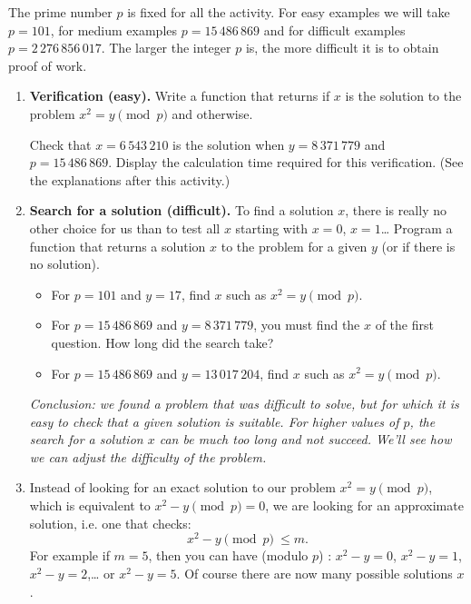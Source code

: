 \documentclass[11pt,class=report,crop=false]{standalone}
\begin{document}
\begin{activite}
The prime number $p$ is fixed for all the activity. 
For easy examples we will take $p = 101$, for medium examples $p = 15\,486\,869$ and for difficult examples $p = 2\,276\,856\,017$. The larger the integer $p$ is, the more difficult it is to obtain proof of work.

\begin{enumerate}
  \item \textbf{Verification (easy).} 
  Write a  function that returns  if $x$ is the solution to the problem $x^2 = y \pmod{p}$ and  otherwise.
  
  Check that $x = 6\,543\,210$ is the solution when $y = 8\,371\,779$ and $p = 15\,486\,869$. Display the calculation time required for this verification. (See the explanations after this activity.)
  
  \item \textbf{Search for a solution (difficult).} To find a solution $x$, there is really no other choice for us than to test all $x$ starting with $x=0$, $x=1$\ldots{}
Program a  function that returns a solution $x$ to the problem for a given $y$ (or  if there is no solution).

  \begin{itemize}
    \item For $p = 101$ and $y=17$, find $x$ such as $x^2 = y \pmod{p}$. 
    \item For $p = 15\,486\,869$ and $y = 8\,371\,779$, you must find the $x$ of the first question. How long did the search take? 
    
    \item For $p = 15\,486\,869$ and $y = 13\,017\,204$, find $x$ such as $x^2 = y \pmod{p}$.    
   \end{itemize}


\medskip

\emph{Conclusion: we found a problem that was difficult to solve, but for which it is easy to check that a given solution is suitable. For higher values of $p$, the search for a solution $x$ can be much too long and not succeed. We'll see how we can adjust the difficulty of the problem.}


	\item Instead of looking for an exact solution to our problem $x^2 = y \pmod{p}$, which is equivalent to $x^2-y \pmod{p} = 0$, we are looking for an approximate solution, i.e. one that checks: $$x^2 - y \pmod{p} \ \le m.$$
	For example if $m=5$, then you can have (modulo $p$) : $x^2 - y = 0$, $x^2 - y = 1$,
	$x^2-y = 2$,\ldots{} or $x^2-y=5$. 
	Of course there are now many possible solutions $x$.
	

\end{enumerate}
\end{activite}
\end{document}
